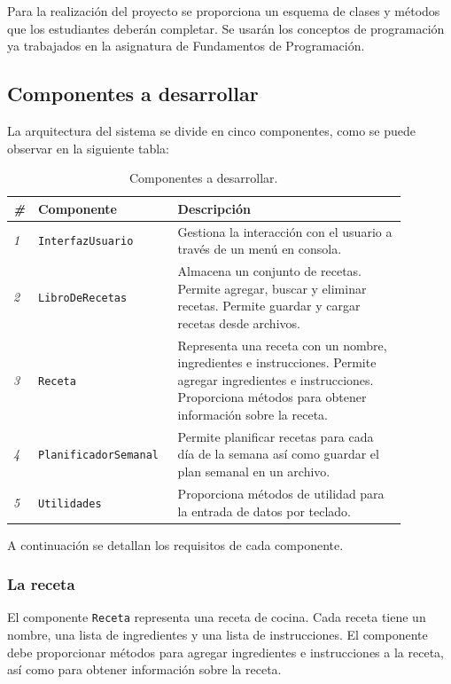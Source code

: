 \documentclass[
    a4paper, %
    12pt, %
]{CSSullivanBusinessReport}
\begin{document}
Para la realización del proyecto se proporciona un esquema de clases y métodos que los estudiantes deberán completar. Se usarán los conceptos de programación ya trabajados en la asignatura de Fundamentos de Programación.

\subsection{Componentes a desarrollar}
La arquitectura del sistema se divide en cinco componentes, como se puede observar en la siguiente tabla:

\begin{table} %
    \caption{Componentes a desarrollar.}
    \begin{tabular}{C{0.03\linewidth} L{0.3\linewidth} L{0.55\linewidth}}
        \toprule
        \textit{\#} & \textbf{Componente} & \textbf{Descripción} \\
        \midrule
        \textit{1} & \texttt{InterfazUsuario} & Gestiona la interacción con el usuario a través de un menú en consola.\\
        \textit{2} & \texttt{LibroDeRecetas} & Almacena un conjunto de recetas. Permite agregar, buscar y eliminar recetas. Permite guardar y cargar recetas desde archivos.\\
        \textit{3} & \texttt{Receta} & Representa una receta con un nombre, ingredientes e instrucciones. Permite agregar ingredientes e instrucciones. Proporciona métodos para obtener información sobre la receta.\\
        \textit{4} & \texttt{PlanificadorSemanal} & Permite planificar recetas para cada día de la semana así como guardar el plan semanal en un archivo.\\
        \textit{5} & \texttt{Utilidades} & Proporciona métodos de utilidad para la entrada de datos por teclado.\\
        \bottomrule
    \end{tabular}
\end{table}

A continuación se detallan los requisitos de cada componente.

\subsubsection{La receta}\label{sec:receta}

El componente \texttt{Receta} representa una receta de cocina. Cada receta tiene un nombre, una lista de ingredientes y una lista de instrucciones. El componente debe proporcionar métodos para agregar ingredientes e instrucciones a la receta, así como para obtener información sobre la receta.
\end{document}
